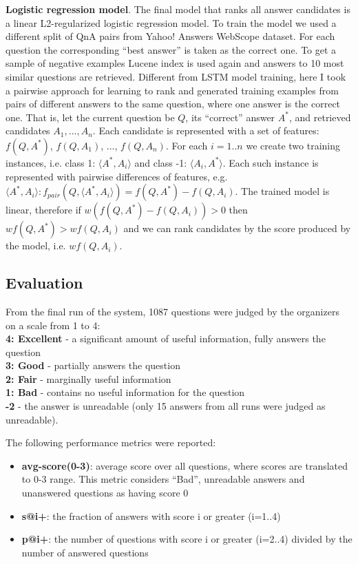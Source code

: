 \textbf{Logistic regression model}.
The final model that ranks all answer candidates is a linear L2-regularized logistic regression model.
To train the model we used a different split of QnA pairs from Yahoo! Answers WebScope dataset.
For each question the corresponding ``best answer'' is taken as the correct one.
To get a sample of negative examples Lucene index is used again and answers to 10 most similar questions are retrieved.
Different from LSTM model training, here I took a pairwise approach for learning to rank and generated training examples from pairs of different answers to the same question, where one answer is the correct one.
That is, let the current question be $Q$, its ``correct'' answer $A^*$, and retrieved candidates $A_1, ..., A_n$.
Each candidate is represented with a set of features: $f(Q, A^*)$, $f(Q, A_1)$, ..., $f(Q, A_n)$.
For each $i=1..n$ we create two training instances, i.e. class 1: $\langle A^*, A_i\rangle$ and class -1: $\langle A_i, A^*\rangle$.
Each such instance is represented with pairwise differences of features, e.g. $\langle A^*, A_i\rangle: f_{pair}(Q, \langle A^*, A_i\rangle) = f(Q, A^*) - f(Q, A_i)$.
The trained model is linear, therefore if $w(f(Q, A^*) - f(Q, A_i)) > 0$ then $w f(Q, A^*) > w f(Q, A_i)$ and we can rank candidates by the score produced by the model, i.e. $w f(Q, A_i)$.

\subsection{Evaluation}
\label{section:non-factoid:liveqa:evaluation}

From the final run of the system, 1087 questions were judged by the organizers on a scale from 1 to 4:\\
\textbf{4: Excellent} - a significant amount of useful information, fully answers the question\\
\textbf{3: Good} - partially answers the question\\
\textbf{2: Fair} - marginally useful information\\
\textbf{1: Bad} - contains no useful information for the question\\
\textbf{-2} - the answer is unreadable (only 15 answers from all runs were judged as unreadable).

The following performance metrics were reported:

\begin{itemize}
\item \textbf{avg-score(0-3)}: average score over all questions, where scores are translated to 0-3 range. This metric considers ``Bad'', unreadable answers and unanswered questions as having score 0
\item \textbf{s@i+}: the fraction of answers with score i or greater (i=1..4)
\item \textbf{p@i+}: the number of questions with score i or greater (i=2..4) divided by the number of answered questions
\end{itemize}

